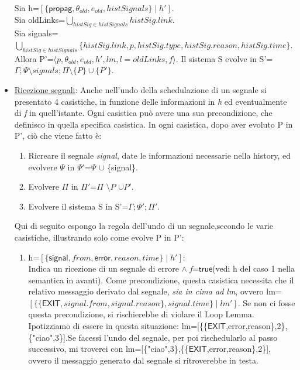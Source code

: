 \documentclass[Contributo.tex]{subfiles}
\begin{document}
\begin{itemize}
		Sia h=$\displaystyle [\{\mathsf{propag},\theta_{old},e_{old},histSignals\} \mid h']$.\\
		Sia oldLinks=$\displaystyle  \bigcup_{histSig \in histSignals}histSig.link $.\\ 
		Sia signals=$\displaystyle \bigcup_{histSig \in histSignals}\{histSig.link,p,histSig.type,histSig.reason,histSig.time\}$.\\
		Allora P'=$\displaystyle \langle p,\theta_{old},e_{old},h',lm,l=oldLinks,f \rangle$.
		Il sistema S evolve in S'=$\displaystyle \Gamma;\Psi \setminus signals;\Pi \setminus \{P\} \cup \{P'\} $.
		\item \underline{Ricezione segnali}: Anche nell'undo della schedulazione di un segnale si presentato 4 casistiche, in funzione delle informazioni in \textit{h} ed eventualmente di \textit{f} in quell'istante.
		Ogni casistica può avere una sua precondizione, che definisco in quella specifica casistica.
		In ogni casistica, dopo aver evoluto P in P', ciò che viene fatto è:
		\begin{enumerate}
			\item Ricreare il segnale \textit{signal}, date le informazioni necessarie nella history, ed evolvere $\Psi$ in $\Psi'$=$\Psi$ $\cup$ \{signal\}.
			\item Evolvere $\Pi$ in $\Pi'$=$\Pi$ $\setminus{P}$ $\cup{P'}$.
			\item Evolvere il sistema S in S'=$\displaystyle \Gamma;\Psi';\Pi'$.
		\end{enumerate}
		Qui di seguito espongo la regola dell'undo di un segnale,secondo le varie casistiche, illustrando solo come evolve P in P':
		\begin{enumerate}
		\item h=$\displaystyle [\{\mathsf{signal},from,\mathsf{error},reason,time\} \mid h']$:\\
			  Indica un ricezione di un  segnale di errore $\wedge$ \textit{f}=$\mathsf{true}$(vedi h del caso 1 nella semantica in avanti).
			  Come precondizione, questa casistica necessita che il relativo messaggio derivato dal segnale, \textit{sia in cima ad lm}, ovvero lm=$\displaystyle [\{\{\mathsf{EXIT},signal.from,signal.reason\},signal.time\} \mid lm']$. Se non ci fosse questa precondizione, si rischierebbe di violare il Loop Lemma. Ipotizziamo di essere in questa situazione:
			  lm=[\{\{$\mathsf{EXIT}$,error,reason\},2\},\{"ciao",3\}].Se facessi l'undo del segnale, per poi rischedularlo al passo successivo, mi troverei con lm=[\{"ciao",3\},\{\{$\mathsf{EXIT}$,error,reason\},2\}], ovvero il messaggio generato dal segnale si ritroverebbe in testa.

\end{enumerate}
\end{itemize}
\end{document}
